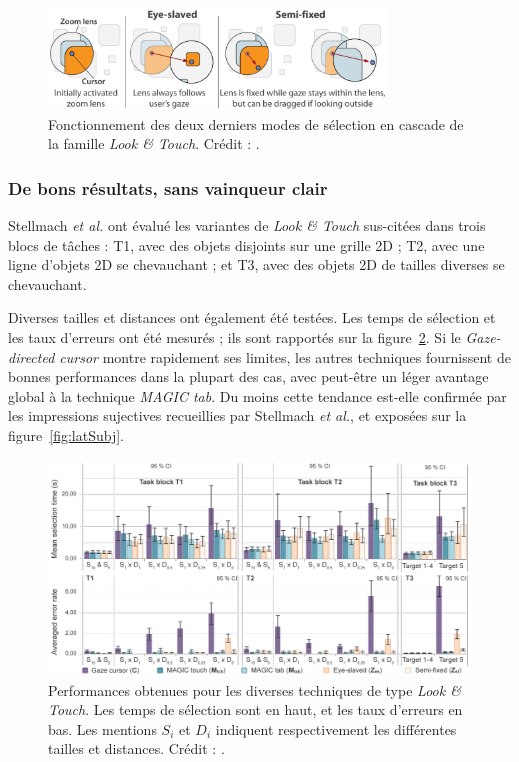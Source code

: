 	\begin{figure}[!htb]
		\centering
		\includegraphics[width=0.8\textwidth]{figures/ch2/lookandtouch2}
		\caption[\emph{Look \&{} Touch -- principe II}]{Fonctionnement des deux derniers modes de sélection en cascade de la famille \emph{Look \&{} Touch}. Crédit : \cite{stellmach2012look}.}
		\label{fig:lookandtouch2}
	\end{figure}
	
	\subsubsection{De bons résultats, sans vainqueur clair}
	Stellmach \emph{et al.} ont évalué les variantes de \emph{Look \&{} Touch} sus-citées dans trois blocs de tâches : T1, avec des objets disjoints sur une grille 2D ; T2, avec une ligne d'objets 2D se chevauchant ; et T3, avec des objets 2D de tailles diverses se chevauchant.
	
	Diverses tailles et distances ont également été testées. Les temps de sélection et les taux d'erreurs ont été mesurés ; ils sont rapportés sur la figure~\ref{fig:latRes}. Si le \emph{Gaze-directed cursor} montre rapidement ses limites, les autres techniques fournissent de bonnes performances dans la plupart des cas, avec peut-être un léger avantage global à la technique \emph{MAGIC tab}. Du moins cette tendance est-elle confirmée par les impressions sujectives recueillies par Stellmach \emph{et al.}, et exposées sur la figure~\ref{fig:latSubj}.

	\begin{figure}[!htb]
		\centering
		\includegraphics[width=\textwidth]{figures/ch2/latRes}
		\caption[\emph{Look \&{} Touch -- performances}]{Performances obtenues pour les diverses techniques de type \emph{Look \&{} Touch}. Les temps de sélection sont en haut, et les taux d'erreurs en bas. Les mentions $S_{i}$ et $D_{i}$ indiquent respectivement les différentes tailles et distances. Crédit : \cite{stellmach2012look}.}
		\label{fig:latRes}
	\end{figure}
	
